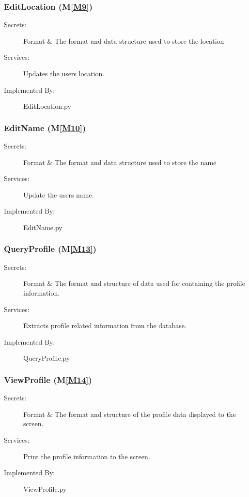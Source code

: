 \documentclass[12pt, titlepage]{article}
\newcommand{\mref}[1]{M\ref{#1}}
\begin{document}
\subsubsection{EditLocation (\mref{M9})}
\begin{description}
\item[Secrets:] Format \& The format and data structure used to store the location
\item[Services:] Updates the users location.
\item[Implemented By:] EditLocation.py
\end{description}

\subsubsection{EditName (\mref{M10})}
\begin{description}
\item[Secrets:] Format \& The format and data structure used to store the name
\item[Services:] Update the users name.
\item[Implemented By:] EditName.py
\end{description}

\subsubsection{QueryProfile (\mref{M13})}
\begin{description}
\item[Secrets:] Format \& The format and structure of data used for containing the profile information.

\item[Services:] Extracts profile related information from the database.
\item[Implemented By:] QueryProfile.py
\end{description}

\subsubsection{ViewProfile (\mref{M14})}
\begin{description}
\item[Secrets:] Format \& The format and structure of the profile data displayed to the screen.
\item[Services:] Print the profile information to the screen.
\item[Implemented By:] ViewProfile.py
\end{description}
\end{document}
